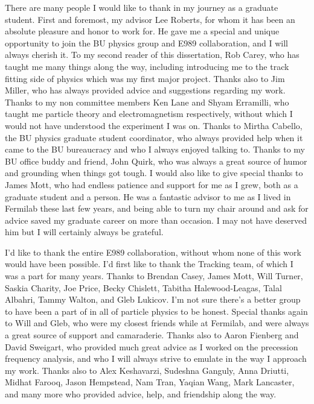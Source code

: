 

There are many people I would like to thank in my journey as a graduate student. First and foremost, my advisor Lee Roberts, for whom it has been an absolute pleasure and honor to work for. He gave me a special and unique opportunity to join the BU physics group and E989 collaboration, and I will always cherish it. To my second reader of this dissertation, Rob Carey, who has taught me many things along the way, including introducing me to the track fitting side of physics which was my first major project. Thanks also to Jim Miller, who has always provided advice and suggestions regarding my work. Thanks to my non \gmtwo committee members Ken Lane and Shyam Erramilli, who taught me particle theory and electromagnetism respectively, without which I would not have understood the experiment I was on. Thanks to Mirtha Cabello, the BU physics graduate student coordinator, who always provided help when it came to the BU bureaucracy and who I always enjoyed talking to. Thanks to my BU office buddy and friend, John Quirk, who was always a great source of humor and grounding when things got tough. I would also like to give special thanks to James Mott, who had endless patience and support for me as I grew, both as a graduate student and a person. He was a fantastic advisor to me as I lived in Fermilab these last few years, and being able to turn my chair around and ask for advice saved my graduate career on more than occasion. I may not have deserved him but I will certainly always be grateful.


I'd like to thank the entire E989 collaboration, without whom none of this work would have been possible. I'd first like to thank the Tracking team, of which I was a part for many years. Thanks to Brendan Casey, James Mott, Will Turner, Saskia Charity, Joe Price, Becky Chislett, Tabitha Halewood-Leagas, Talal Albahri, Tammy Walton, and Gleb Lukicov. I'm not sure there's a better group to have been a part of in all of particle physics to be honest. Special thanks again to Will and Gleb, who were my closest friends while at Fermilab, and were always a great source of support and camaraderie. Thanks also to Aaron Fienberg and David Sweigart, who provided much great advice as I worked on the precession frequency analysis, and who I will always strive to emulate in the way I approach my work. Thanks also to Alex Keshavarzi, Sudeshna Ganguly, Anna Driutti, Midhat Farooq, Jason Hempstead, Nam Tran, Yaqian Wang, Mark Lancaster, and many more who provided advice, help, and friendship along the way. 



